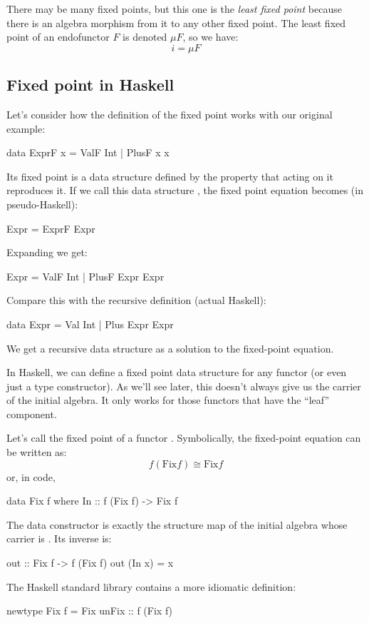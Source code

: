 \documentclass[DaoFP]{subfiles}
\begin{document}
There may be many fixed points, but this one is the \emph{least fixed point} because there is an algebra morphism from it to any other fixed point. The least fixed point of an endofunctor $F$ is denoted $\mu F$, so we have:
\[ i = \mu F \]
\subsection{Fixed point in Haskell}
Let's consider how the definition of the fixed point works with our original example:
\begin{haskell}
data ExprF x = ValF Int | PlusF x x
\end{haskell}
Its fixed point is a data structure defined by the property that  acting on it reproduces it. If we call this data structure , the fixed point equation becomes  (in pseudo-Haskell):
\begin{haskell}
Expr = ExprF Expr
\end{haskell}
Expanding  we get:
\begin{haskell}
Expr = ValF Int | PlusF Expr Expr
\end{haskell}
Compare this with the recursive definition (actual Haskell):
\begin{haskell}
data Expr = Val Int | Plus Expr Expr
\end{haskell}
We get a recursive data structure as a solution to the fixed-point equation.

In Haskell, we can define a fixed point data structure for any functor (or even just a type constructor). As we'll see later, this doesn't always give us the carrier of the initial algebra. It only works for those functors that have the ``leaf'' component.

Let's call  the fixed point of a functor . Symbolically, the fixed-point equation can be written as:
\[f ( \text{Fix} f) \cong  \text{Fix} f \]
or, in code,
\begin{haskell}
data Fix f where
  In :: f (Fix f) -> Fix f
\end{haskell}
The data constructor  is exactly the structure map of the initial algebra whose carrier is . Its inverse is:
\begin{haskell}
out :: Fix f -> f (Fix f)
out (In x) = x
\end{haskell}
The Haskell standard library contains a more idiomatic definition:
\begin{haskell}
newtype Fix f = Fix { unFix :: f (Fix f) }
\end{haskell}
\end{document}
